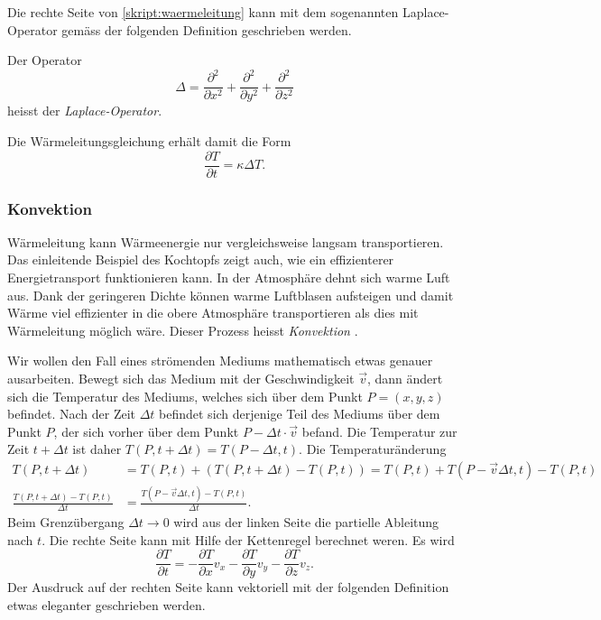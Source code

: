 Die rechte Seite von \eqref{skript:waermeleitung} kann mit dem
sogenannten Laplace-Operator gemäss der folgenden Definition 
geschrieben werden.

\begin{definition}
Der Operator
\[
\Delta
=
\frac{\partial^2}{\partial x^2}
+
\frac{\partial^2}{\partial y^2}
+
\frac{\partial^2}{\partial z^2}
\]
heisst der
{\em Laplace-Operator}.
\end{definition}

Die Wärmeleitungsgleichung erhält damit die Form
\begin{equation}
\frac{\partial T}{\partial t}
=
\kappa\Delta T.
\label{skript:waermeleitung2}
\end{equation}

\subsubsection{Konvektion}
Wärmeleitung kann Wärmeenergie nur vergleichsweise langsam transportieren.
Das einleitende Beispiel des Kochtopfs zeigt auch, wie ein effizienterer
Energietransport funktionieren kann.
In der Atmosphäre dehnt sich warme Luft aus.
Dank der geringeren Dichte können warme Luftblasen aufsteigen und damit
Wärme viel effizienter in die obere Atmosphäre transportieren
als dies mit Wärmeleitung möglich wäre.
Dieser Prozess heisst {\em Konvektion} \cite{skript:konvektion}.
%

Wir wollen den Fall eines strömenden Mediums mathematisch etwas genauer
ausarbeiten.
Bewegt sich das Medium mit der Geschwindigkeit $\vec v$, dann ändert sich
die Temperatur des Mediums, welches sich über dem Punkt $P=(x,y,z)$
befindet.
Nach der Zeit $\Delta t$ befindet sich derjenige Teil des Mediums
über dem Punkt $P$, der sich vorher über dem Punkt $P-\Delta t\cdot\vec v$
befand.
Die Temperatur zur Zeit $t+\Delta t$ ist daher
$T(P,t+\Delta t)=T(P-\Delta t,t)$.
Die Temperaturänderung
\begin{align*}
T(P,t+\Delta t)
&=
T(P,t) + (T(P,t+\Delta t)-T(P,t))
=
T(P,t) + T(P-\vec v\Delta t, t)-T(P,t)
\\
\frac{
T(P,t+\Delta t)
-
T(P,t)
}{\Delta t}
&=
\frac{
T(P-\vec v\Delta t, t)-T(P,t)
}{\Delta t}.
\end{align*}
Beim Grenzübergang $\Delta t\to 0$ wird aus der linken Seite die
partielle Ableitung nach $t$.
Die rechte Seite kann mit Hilfe der Kettenregel berechnet weren.
Es wird
\begin{equation}
\frac{\partial T}{\partial t}
=
-
\frac{\partial T}{\partial x} v_x
-
\frac{\partial T}{\partial y} v_y
-
\frac{\partial T}{\partial z} v_z.
\label{skript:advektion1}
\end{equation}
Der Ausdruck auf der rechten Seite kann vektoriell mit der folgenden
Definition etwas eleganter geschrieben werden.

